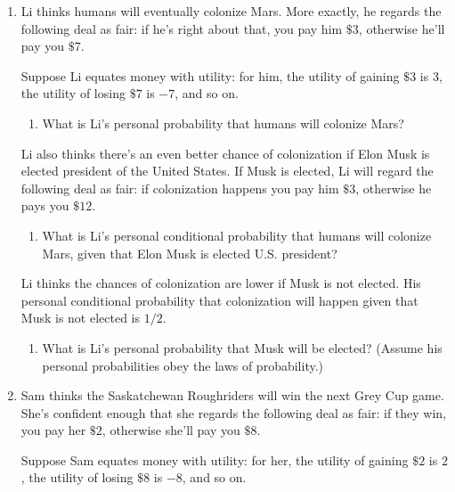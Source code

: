 \documentclass[justified]{tufte-book}
\providecommand{\tightlist}{%
  \setlength{\itemsep}{0pt}\setlength{\parskip}{0pt}}
\theoremstyle{definition}
\theoremstyle{definition}
\theoremstyle{definition}
\theoremstyle{definition}
\theoremstyle{remark}
\begin{document}
\begin{enumerate}
\item
  Li thinks humans will eventually colonize Mars. More exactly, he regards the following deal as fair: if he's right about that, you pay him \(\$3\), otherwise he'll pay you \(\$7\).

  Suppose Li equates money with utility: for him, the utility of gaining \(\$3\) is \(3\), the utility of losing \(\$7\) is \(-7\), and so on.

  \begin{enumerate}
  \def\labelenumii{\alph{enumii}.}
  \tightlist
  \item
    What is Li's personal probability that humans will colonize Mars?
  \end{enumerate}

  Li also thinks there's an even better chance of colonization if Elon Musk is elected president of the United States. If Musk is elected, Li will regard the following deal as fair: if colonization happens you pay him \(\$3\), otherwise he pays you \(\$12\).

  \begin{enumerate}
  \def\labelenumii{\alph{enumii}.}
  \setcounter{enumii}{1}
  \tightlist
  \item
    What is Li's personal conditional probability that humans will colonize Mars, given that Elon Musk is elected U.S. president?
  \end{enumerate}

  Li thinks the chances of colonization are lower if Musk is not elected. His personal conditional probability that colonization will happen given that Musk is not elected is \(1/2\).

  \begin{enumerate}
  \def\labelenumii{\alph{enumii}.}
  \setcounter{enumii}{2}
  \tightlist
  \item
    What is Li's personal probability that Musk will be elected? (Assume his personal probabilities obey the laws of probability.)
  \end{enumerate}
\item
  Sam thinks the Saskatchewan Roughriders will win the next Grey Cup game. She's confident enough that she regards the following deal as fair: if they win, you pay her \(\$2\), otherwise she'll pay you \(\$8\).

  Suppose Sam equates money with utility: for her, the utility of gaining \(\$2\) is \(2\), the utility of losing \(\$8\) is \(-8\), and so on.


\end{enumerate}
\end{document}
